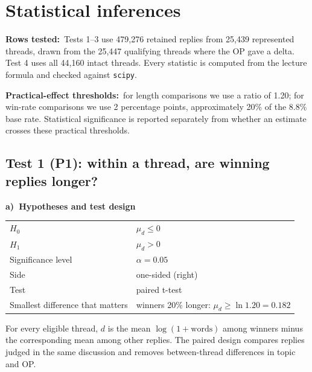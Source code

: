 \documentclass[10pt,a4paper,twocolumn]{article}
\newcommand{\eg}[1]{\textcolor{eg}{#1}}
\newcommand{\field}[2]{\textbf{#1}~\eg{#2}\par}
\newcommand{\tpart}[2]{\par\needspace{12\baselineskip}\smallskip\textbf{#1)~#2}\par}
\newcommand{\code}[1]{\texttt{#1}}
\renewcommand{\eg}[1]{#1}
\begin{document}
\section{Statistical inferences}

\field{Rows tested:}{Tests 1--3 use 479{,}276 retained replies from 25{,}439 represented threads, drawn from the 25{,}447 qualifying threads where the OP gave a delta. Test 4 uses all 44{,}160 intact threads. Every statistic is computed from the lecture formula and checked against \code{scipy}.}

\field{Practical-effect thresholds:}{for length comparisons we use a ratio of 1.20; for win-rate comparisons we use 2 percentage points, approximately 20\% of the 8.8\% base rate. Statistical significance is reported separately from whether an estimate crosses these practical thresholds.}

\subsection*{Test 1 (P1): within a thread, are winning replies longer?}

\tpart{a}{Hypotheses and test design}
{\small
\begin{tabularx}{\linewidth}{@{}K{3.4cm} Y@{}}
\toprule
$H_0$ & $\mu_d\le0$ \\
$H_1$ & $\mu_d>0$ \\
Significance level & $\alpha=0.05$ \\
Side & one-sided (right) \\
Test & paired t-test \\
Smallest difference that matters & winners 20\% longer: $\mu_d\ge\ln1.20=0.182$ \\
\bottomrule
\end{tabularx}}

For every eligible thread, $d$ is the mean $\log(1+\text{words})$ among winners minus the corresponding mean among other replies. The paired design compares replies judged in the same discussion and removes between-thread differences in topic and OP.
\end{document}
